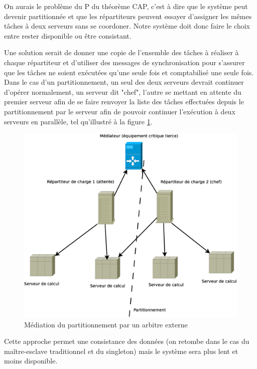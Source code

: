 On aurais le problème du P du théorème CAP, c'est à dire que le système peut devenir partitionnée et que les répartiteurs 
peuvent essayer d'assigner les mêmes tâches à deux serveurs sans se coordoner. Notre système doit donc faire le choix entre rester
disponible ou être consistant. 

Une solution serait de donner une copie de l'ensemble des tâches à réaliser à chaque répartiteur et d'utiliser des messages de synchronisation pour s'assurer que les 
tâches ne soient exécutées qu'une seule fois et comptabilisé une seule fois. Dans le cas d'un partitionnement, un seul des deux serveurs devrait continuer d'opérer normalement, 
un serveur dit "chef", l'autre se mettant en attente du premier serveur afin de se faire renvoyer la liste des tâches effectuées depuis le partitionnement par le serveur 
afin de pouvoir continuer l'exécution à deux serveurs en parallèle, tel qu'illustré à la figure \ref{fig:arch_2_chef}.

\begin{figure}
  \includegraphics[width=\linewidth]{Arch_2_part_mediator.eps}
  \caption{Médiation du partitionnement par un arbitre externe}
  \label{fig:arch_2_chef}
\end{figure}

Cette approche permet une consistance des données (on retombe dans le cas du maître-esclave traditionnel
et du singleton) mais le système sera plus lent et moins disponible. 

